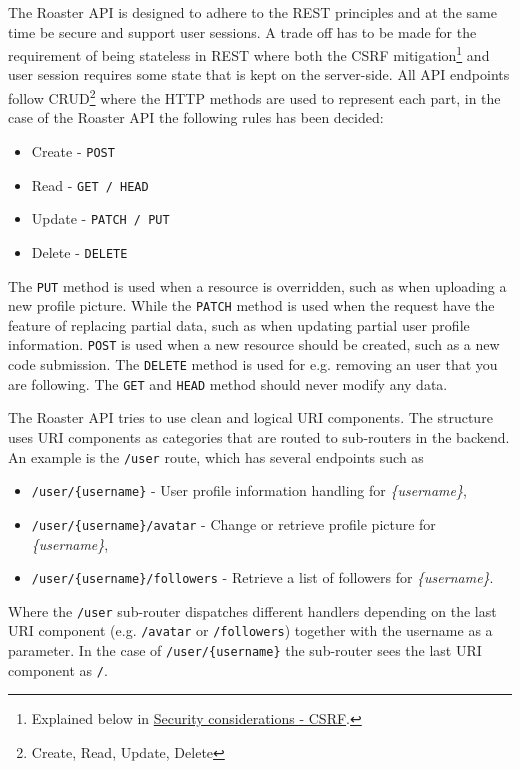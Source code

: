 \documentclass[12pt,a4paper]{report}
\begin{document}
The Roaster API is designed to adhere to the REST principles and at the same time be secure and support user sessions. A trade off has to be made for the requirement of being stateless in REST\cite{fielding-rest} where both the CSRF mitigation\footnote{Explained below in \hyperref[subsec:csrf]{Security considerations - CSRF}.} and user session requires some state that is kept on the server-side. All API endpoints follow CRUD\footnote{Create, Read, Update, Delete} where the HTTP methods are used to represent each part, in the case of the Roaster API the following rules has been decided:
\begin{itemize}
    \item Create - \texttt{POST}
    \item Read - \texttt{GET / HEAD}
    \item Update - \texttt{PATCH / PUT}
    \item Delete - \texttt{DELETE}
\end{itemize}
The \texttt{PUT} method is used when a resource is overridden, such as when uploading a new profile picture. While the \texttt{PATCH} method is used when the request have the feature of replacing partial data, such as when updating partial user profile information. \texttt{POST} is used when a new resource should be created, such as a new code submission. The \texttt{DELETE} method is used for e.g. removing an user that you are following. The \texttt{GET} and \texttt{HEAD} method should never modify any data.

The Roaster API tries to use clean and logical URI components. The structure uses URI components as categories that are routed to sub-routers in the backend. An example is the \texttt{/user} route, which has several endpoints such as
\begin{itemize}
    \item \texttt{/user/\{username\}} - User profile information handling for \textit{\{username\}},
    \item \texttt{/user/\{username\}/avatar} - Change or retrieve profile picture for \textit{\{username\}},
    \item \texttt{/user/\{username\}/followers} - Retrieve a list of followers for \textit{\{username\}}.
\end{itemize}
Where the \texttt{/user} sub-router dispatches different handlers depending on the last URI component (e.g. \texttt{/avatar} or \texttt{/followers}) together with the username as a parameter. In the case of \texttt{/user/\{username\}} the sub-router sees the last URI component as \texttt{/}.
\end{document}

